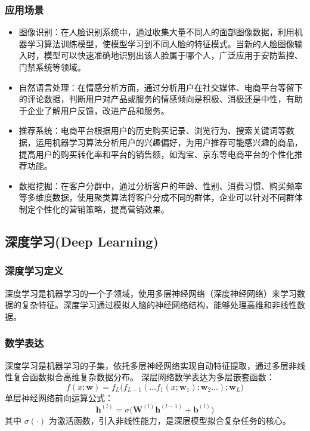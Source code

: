 \documentclass[12pt]{article}
\begin{document}
\subsubsection{应用场景}
\begin{itemize}
    \item 图像识别：在人脸识别系统中，通过收集大量不同人的面部图像数据，利用机器学习算法训练模型，使模型学习到不同人脸的特征模式。当新的人脸图像输入时，模型可以快速准确地识别出该人脸属于哪个人，广泛应用于安防监控、门禁系统等领域。
    
    \item 自然语言处理：在情感分析方面，通过分析用户在社交媒体、电商平台等留下的评论数据，判断用户对产品或服务的情感倾向是积极、消极还是中性，有助于企业了解用户反馈，改进产品和服务。
    
    \item 推荐系统：电商平台根据用户的历史购买记录、浏览行为、搜索关键词等数据，运用机器学习算法分析用户的兴趣偏好，为用户推荐可能感兴趣的商品，提高用户的购买转化率和平台的销售额，如淘宝、京东等电商平台的个性化推荐功能。
    
    \item 数据挖掘：在客户分群中，通过分析客户的年龄、性别、消费习惯、购买频率等多维度数据，使用聚类算法将客户分成不同的群体，企业可以针对不同群体制定个性化的营销策略，提高营销效果。

\end{itemize}


\subsection{深度学习(Deep Learning)}
\subsubsection{深度学习定义}
深度学习是机器学习的一个子领域，使用多层神经网络（深度神经网络）来学习数据的复杂特征。深度学习通过模拟人脑的神经网络结构，能够处理高维和非线性数据。

\subsubsection{数学表达}
深度学习是机器学习的子集，依托多层神经网络实现自动特征提取，通过多层非线性复合函数拟合高维复杂数据分布。
深层网络数学表达为多层嵌套函数：
\[
f(x;\boldsymbol{w})=f_L\big(f_{L-1}(\dots f_1(x;\boldsymbol{w}_1);\boldsymbol{w}_2\dots);\boldsymbol{w}_L\big)
\]
单层神经网络前向运算公式：
\[
\boldsymbol{h}^{(l)}=\sigma\big(\boldsymbol{W}^{(l)}\boldsymbol{h}^{(l-1)}+\boldsymbol{b}^{(l)}\big)
\]
其中 $\sigma(\cdot)$ 为激活函数，引入非线性能力，是深层模型拟合复杂任务的核心。
\end{document}
